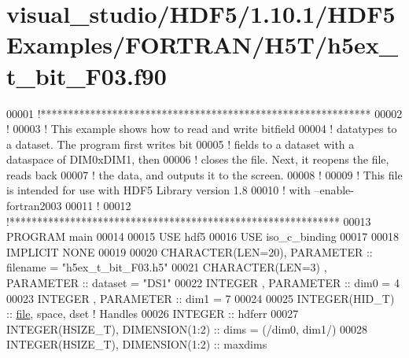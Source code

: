 \hypertarget{visual__studio_2_h_d_f5_21_810_81_2_h_d_f5_examples_2_f_o_r_t_r_a_n_2_h5_t_2h5ex__t__bit___f03_8f90_source}{}\section{visual\+\_\+studio/\+H\+D\+F5/1.10.1/\+H\+D\+F5\+Examples/\+F\+O\+R\+T\+R\+A\+N/\+H5\+T/h5ex\+\_\+t\+\_\+bit\+\_\+\+F03.f90}
\label{visual__studio_2_h_d_f5_21_810_81_2_h_d_f5_examples_2_f_o_r_t_r_a_n_2_h5_t_2h5ex__t__bit___f03_8f90_source}

\begin{DoxyCode}
00001 \textcolor{comment}{!************************************************************}
00002 \textcolor{comment}{!}
00003 \textcolor{comment}{!  This example shows how to read and write bitfield}
00004 \textcolor{comment}{!  datatypes to a dataset.  The program first writes bit}
00005 \textcolor{comment}{!  fields to a dataset with a dataspace of DIM0xDIM1, then}
00006 \textcolor{comment}{!  closes the file.  Next, it reopens the file, reads back}
00007 \textcolor{comment}{!  the data, and outputs it to the screen.}
00008 \textcolor{comment}{!}
00009 \textcolor{comment}{!  This file is intended for use with HDF5 Library version 1.8}
00010 \textcolor{comment}{!  with --enable-fortran2003}
00011 \textcolor{comment}{!}
00012 \textcolor{comment}{!************************************************************}
00013 \textcolor{keyword}{PROGRAM} main
00014 
00015   \textcolor{keywordtype}{USE }hdf5
00016   \textcolor{keywordtype}{USE }iso\_c\_binding
00017   
00018   \textcolor{keywordtype}{IMPLICIT NONE}
00019 
00020   \textcolor{keywordtype}{CHARACTER(LEN=20)}, \textcolor{keywordtype}{PARAMETER} :: filename  = \textcolor{stringliteral}{"h5ex\_t\_bit\_F03.h5"}
00021   \textcolor{keywordtype}{CHARACTER(LEN=3)} , \textcolor{keywordtype}{PARAMETER} :: dataset   = \textcolor{stringliteral}{"DS1"}
00022   \textcolor{keywordtype}{INTEGER}          , \textcolor{keywordtype}{PARAMETER} :: dim0      = 4
00023   \textcolor{keywordtype}{INTEGER}          , \textcolor{keywordtype}{PARAMETER} :: dim1      = 7
00024 
00025   \textcolor{keywordtype}{INTEGER(HID\_T)}  :: \hyperlink{structfile}{file}, space, dset \textcolor{comment}{! Handles}
00026   \textcolor{keywordtype}{INTEGER} :: hdferr
00027   \textcolor{keywordtype}{INTEGER(HSIZE\_T)}, \textcolor{keywordtype}{DIMENSION(1:2)}   :: dims = (/dim0, dim1/)
00028   \textcolor{keywordtype}{INTEGER(HSIZE\_T)}, \textcolor{keywordtype}{DIMENSION(1:2)}   :: maxdims

\end{DoxyCode}
